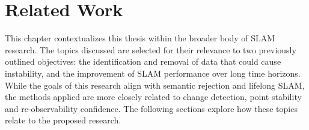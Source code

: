 \section{Related Work}
\label{sec:related_work}

This chapter contextualizes this thesis within the broader body of SLAM research. The topics discussed are selected for their relevance to two previously outlined objectives: the identification and removal of data that could cause instability, and the improvement of SLAM performance over long time horizons. While the goals of this research align with semantic rejection and lifelong SLAM, the methods applied are more closely related to change detection, point stability and re-observability confidence. The following sections explore how these topics relate to the proposed research.

% 
